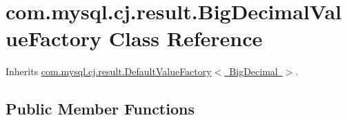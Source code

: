 \hypertarget{classcom_1_1mysql_1_1cj_1_1result_1_1_big_decimal_value_factory}{}\section{com.\+mysql.\+cj.\+result.\+Big\+Decimal\+Value\+Factory Class Reference}
\label{classcom_1_1mysql_1_1cj_1_1result_1_1_big_decimal_value_factory}


Inherits \mbox{\hyperlink{classcom_1_1mysql_1_1cj_1_1result_1_1_default_value_factory}{com.\+mysql.\+cj.\+result.\+Default\+Value\+Factory$<$ Big\+Decimal $>$}}.

\subsection*{Public Member Functions}
